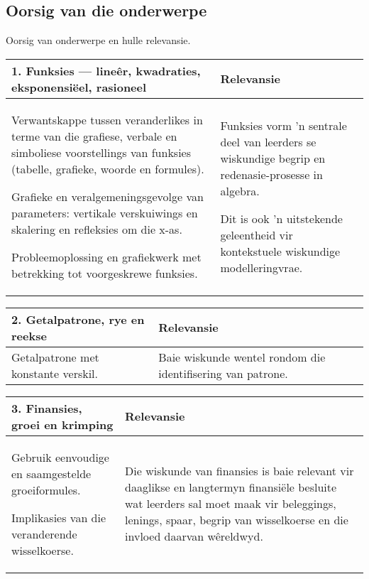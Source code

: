 \subsection{Oorsig van die onderwerpe}
Oorsig van onderwerpe en hulle relevansie.

\begin{table}[H]
  \begin{center} 
    \begin{tabular}{|p{8.5cm}|p{3.5cm}|} \hline
\textbf{1. Funksies --- lineêr, kwadraties, eksponensiëel, rasioneel} &
\textbf{Relevansie}  \\ \hline  
Verwantskappe tussen veranderlikes in terme van die grafiese, verbale
en simboliese voorstellings van funksies (tabelle, grafieke, woorde en
formules).\par
Grafieke en veralgemeningsgevolge van parameters: vertikale
verskuiwings en skalering en refleksies om die x-as.\par
Probleemoplossing en grafiekwerk met betrekking tot voorgeskrewe funksies.
&
Funksies vorm 'n sentrale deel van leerders se wiskundige begrip en
redenasie-prosesse in algebra.\par
Dit is ook 'n uitstekende geleentheid vir kontekstuele wiskundige
modelleringvrae. \\ \hline
    \end{tabular}
  \end{center}
\end{table}

\begin{table}[H]
\begin{center} 
\begin{tabular}{|p{8.5cm}|p{3.5cm}|} \hline
\textbf{2. Getalpatrone, rye en reekse}&\textbf{Relevansie} \\ \hline  
Getalpatrone met konstante verskil.
&
Baie wiskunde wentel rondom die identifisering van patrone.
\\ \hline
 \end{tabular}
\end{center}
\end{table}

\begin{table}[H]
\begin{center} 
\begin{tabular}{|p{8.5cm}|p{3.5cm}|} \hline
\textbf{3. Finansies, groei en krimping}& \textbf{Relevansie} \\ \hline  
Gebruik eenvoudige en saamgestelde groeiformules.\par
Implikasies van die veranderende wisselkoerse.
&
Die wiskunde van finansies is baie relevant vir daaglikse en
langtermyn finansi\"{e}le besluite wat leerders sal moet maak vir
beleggings, lenings, spaar, begrip van wisselkoerse en die invloed
daarvan w\^{e}reldwyd.
\\ \hline

 \end{tabular}
\end{center}
\end{table}

